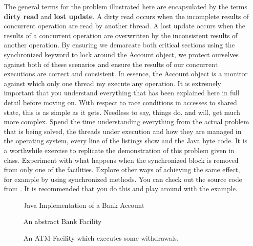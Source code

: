 \documentclass[10pt,a4paper]{article}
\begin{document}
\newline\newline
The general terms for the problem illustrated here are encapsulated by the terms {\bf dirty read} and {\bf lost update}. A dirty read occurs when the incomplete results of concurrent operation are read by another thread. A lost update occurs when the results of a concurrent operation are overwritten by the inconsistent results of another operation. By ensuring we demarcate both critical sections using the synchronized keyword to lock around the Account object, we protect ourselves against both of these scenarios and ensure the results of our concurrent executions are correct and consistent. In essence, the Account object is a monitor against which only one thread my execute any operation. 
\newline\newline
It is extremely important that you understand everything that has been explained here in full detail before moving on. With respect to race conditions in accesses to shared state, this is  as simple as it gets. Needless to say, things do, and will, get much more complex. Spend the time understanding everything from the actual problem that is being solved, the threads under execution and how they are managed in the operating system, every line of the listings show and the Java byte code. It is a worthwhile exercise to replicate the demonstration of this problem given in class. Experiment with what happens when the synchronized block is removed from only one of the facilities. Explore other ways of achieving the same effect, for example by using synchronized methods. You can check out the source code from \cite{GITHUB}. It is recommended that you do this and play around with the example.
\begin{figure}
\caption{Java Implementation of a Bank Account}
\begin{center}

\label{jaccount}
\end{center}
\end{figure}

\begin{figure}
\caption{An abstract Bank Facility}
\begin{center}

\label{jfacility}
\end{center}
\end{figure}

\begin{figure}
\caption{An ATM Facility which executes some withdrawals.}
\begin{center}

\label{jatm}
\end{center}
\end{figure}
\end{document}
